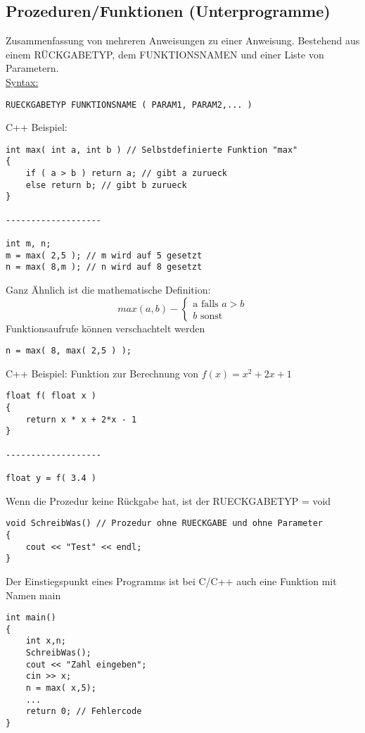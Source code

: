\subsection{Prozeduren/Funktionen (Unterprogramme)}
Zusammenfassung von mehreren Anweisungen zu einer Anweisung. Bestehend aus einem RÜCKGABETYP, dem FUNKTIONSNAMEN und einer Liste von Parametern. \\
\underline{Syntax:}
\begin{lstlisting}
RUECKGABETYP FUNKTIONSNAME ( PARAM1, PARAM2,... )
\end{lstlisting}
C++ Beispiel:
\begin{lstlisting}
int max( int a, int b ) // Selbstdefinierte Funktion "max"
{
	if ( a > b ) return a; // gibt a zurueck
	else return b; // gibt b zurueck
}

-------------------

int m, n;
m = max( 2,5 ); // m wird auf 5 gesetzt
n = max( 8,m ); // n wird auf 8 gesetzt
\end{lstlisting}
Ganz Ähnlich ist die mathematische Definition: 
\[
max (a,b) - \left\{\begin{array}{cl}  \mbox{a falls }a>b\\ b \mbox{ sonst} \end{array}\right.
\]
Funktionsaufrufe können verschachtelt werden
\begin{lstlisting}
n = max( 8, max( 2,5 ) );
\end{lstlisting}
C++ Beispiel: Funktion zur Berechnung von $f(x) = x^2 +2x +1$
\begin{lstlisting}
float f( float x )
{
	return x * x + 2*x - 1
}

-------------------

float y = f( 3.4 )
\end{lstlisting}
Wenn die Prozedur keine Rückgabe hat, ist der RUECKGABETYP = void
\begin{lstlisting}
void SchreibWas() // Prozedur ohne RUECKGABE und ohne Parameter
{
	cout << "Test" << endl;
}
\end{lstlisting}
Der Einstiegspunkt eines Programms ist bei C/C++ auch eine Funktion mit Namen \glqq main\grqq
\begin{lstlisting}
int main()
{
	int x,n;
	SchreibWas();
	cout << "Zahl eingeben";
	cin >> x;
	n = max( x,5);
	...
	return 0; // Fehlercode
}
\end{lstlisting}

